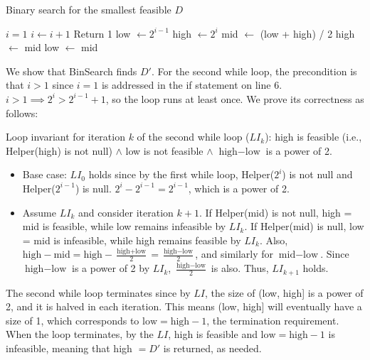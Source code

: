 \documentclass[11pt]{article}
\begin{document}

\begin{algorithm}[H]
\caption{Binary search for the smallest feasible $D$}
\begin{algorithmic}[1]
\State $i=1$
  \State $i \gets i+1$ \EndWhile
{} \State Return 1 \EndIf
\State low $\gets 2^{i-1}$
\State high $\gets 2^i$
\State mid $\gets$ (low + high) / 2
 \State high $\gets$ mid
\Else \State low $\gets$ mid
\EndIf
\EndWhile\\
\EndFunction
\end{algorithmic}
\end{algorithm}

We show that BinSearch finds $D'$. For the second while loop, the precondition is that $i>1$ since $i=1$ is addressed in the if statement on line 6. $i>1\implies 2^i>2^{i-1}+1$, so the loop runs at least once. We prove its correctness as follows:

Loop invariant for iteration $k$ of the second while loop ($LI_k$): high is feasible (i.e., Helper(high) is not null) $\land$ low is not feasible $\land$ $\text{high}-\text{low}$ is a power of 2.

\begin{itemize}
    \item Base case: $LI_0$ holds since by the first while loop, Helper($2^i$) is not null and Helper($2^{i-1}$) is null. $2^i-2^{i-1}=2^{i-1}$, which is a power of 2.
    \item Assume $LI_k$ and consider iteration $k+1$. If Helper(mid) is not null, high = mid is feasible, while low remains infeasible by $LI_k$. If Helper(mid) is null, low = mid is infeasible, while high remains feasible by $LI_k$. Also, $\text{high}-\text{mid}=\text{high}-\frac{\text{high}+\text{low}}{2}=\frac{\text{high}-\text{low}}{2}$, and similarly for $\text{mid}-\text{low}$. Since $\text{high}-\text{low}$ is a power of 2 by $LI_k$, $\frac{\text{high}-\text{low}}{2}$ is also. Thus, $LI_{k+1}$ holds.
\end{itemize}

The second while loop terminates since by $LI$, the size of (low, high] is a power of 2, and it is halved in each iteration. This means (low, high] will eventually have a size of 1, which corresponds to $\text{low}=\text{high}-1$, the termination requirement. When the loop terminates, by the $LI$, high is feasible and $\text{low}=\text{high}-1$ is infeasible, meaning that high $=D'$ is returned, as needed.
\end{document}
